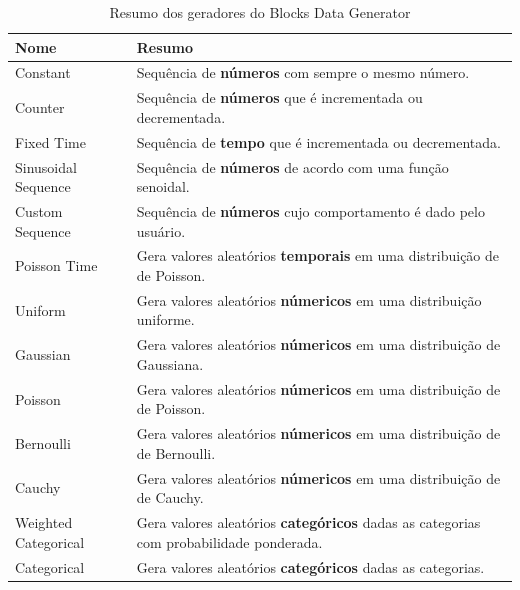 \documentclass[
	12pt,				%
	openright,			%
	twoside,			%
	a4paper,			%
	english,			%
	brazil				%
	]{abntex2}
\begin{document}
		\begin{table}[h]
			\centering
			\caption{Resumo dos geradores do Blocks Data Generator}
			\vspace{0.5cm}
			\label{table: Resumo Geradores Blocks}
			\begin{tabular}{l|p{14cm}}
			
				Nome                 & Resumo \\ %
				\hline %
				Constant             & Sequência de \textbf{números} com sempre o mesmo número.\\
				Counter              & Sequência de \textbf{números} que é incrementada ou decrementada.\\
				Fixed Time           & Sequência de \textbf{tempo} que é incrementada ou decrementada.\\
				Sinusoidal Sequence  & Sequência de \textbf{números} de acordo com uma função senoidal.\\
				Custom Sequence      & Sequência de \textbf{números} cujo comportamento é dado pelo usuário.\\
				Poisson Time         & Gera valores aleatórios \textbf{temporais} em uma distribuição de de Poisson.\\
				Uniform              & Gera valores aleatórios \textbf{númericos} em uma distribuição uniforme.\\
				Gaussian             & Gera valores aleatórios \textbf{númericos} em uma distribuição de Gaussiana.\\
				Poisson              & Gera valores aleatórios \textbf{númericos} em uma distribuição de de Poisson.\\
				Bernoulli            & Gera valores aleatórios \textbf{númericos} em uma distribuição de de Bernoulli.\\
				Cauchy               & Gera valores aleatórios \textbf{númericos} em uma distribuição de de Cauchy.\\
				Weighted Categorical & Gera valores aleatórios \textbf{categóricos} dadas as categorias com probabilidade ponderada.\\
				Categorical          & Gera valores aleatórios \textbf{categóricos} dadas as categorias.\\

\end{tabular}
\end{table}
\end{document}
